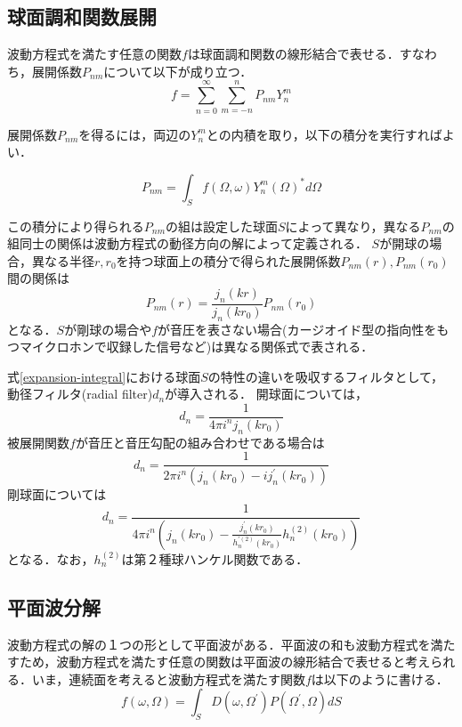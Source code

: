 \documentclass[a4paper,12pt]{jsarticle}
\begin{document}
\subsection{球面調和関数展開}
波動方程式を満たす任意の関数$f$は球面調和関数の線形結合で表せる．すなわち，展開係数$P_{nm}$について以下が成り立つ．
\begin{equation}
    \label{spherical-expansion}
    f=\sum_{n=0}^{\infty} \sum_{m=-n}^{n} P_{n m} Y_{n}^{m}
\end{equation}

展開係数$P_{nm}$を得るには，両辺の$Y_{n}^{m}$との内積を取り，以下の積分を実行すればよい．

\begin{equation}
    \label{expansion-integral}
    P_{n m}=\int_{S} f(\Omega, \omega) Y_{n}^{m}(\Omega)^{*} d \Omega
\end{equation}

この積分により得られる$P_{nm}$の組は設定した球面$S$によって異なり，異なる$P_{nm}$の組同士の関係は波動方程式の動径方向の解によって定義される．
$S$が開球の場合，異なる半径$r, r_0$を持つ球面上の積分で得られた展開係数$P_{nm}(r), P_{nm}(r_0)$間の関係は
$$
    P_{n m}(r)=\frac{j_{n}(k r)}{j_{n}\left(k r_{0}\right)} P_{n m}\left(r_{0}\right)
$$
となる\cite{EGW99}．$S$が剛球の場合や$f$が音圧を表さない場合(カージオイド型の指向性をもつマイクロホンで収録した信号など)は異なる関係式で表される．

式\ref{expansion-integral}における球面$S$の特性の違いを吸収するフィルタとして，動径フィルタ(radial filter)$d_n$が導入される．
開球面については，
$$
    d_{n}=\frac{1}{4 \pi i^{n} j_{n}\left(k r_{0}\right)}
$$
被展開関数$f$が音圧と音圧勾配の組み合わせである場合は
$$
    d_{n}=\frac{1}{2 \pi i^{n}\left(j_{n}\left(k r_{0}\right)-i j_{n}^{\prime}\left(k r_{0}\right)\right)}
$$
剛球面については
$$
    d_{n}=\frac{1}{4 \pi i^{n}\left(j_{n}\left(k r_{0}\right)-\frac{j_{n}^{\prime}\left(k r_{0}\right)}{h_{n}^{\prime(2)}\left(k r_{0}\right)} h_{n}^{(2)}\left(k r_{0}\right)\right)}
$$
となる．なお，$h_{n}^{(2)}$は第２種球ハンケル関数である．

\subsection{平面波分解}
波動方程式の解の１つの形として平面波がある．平面波の和も波動方程式を満たすため，波動方程式を満たす任意の関数は平面波の線形結合で表せると考えられる．いま，連続面を考えると波動方程式を満たす関数$f$は以下のように書ける．
\begin{equation}
    \label{plane-wave-decomposition}
    f(\omega, \Omega)=\int_{S} D\left(\omega, \Omega^{\prime}\right) P\left(\Omega^{\prime}, \Omega\right) d S
\end{equation}
\end{document}
